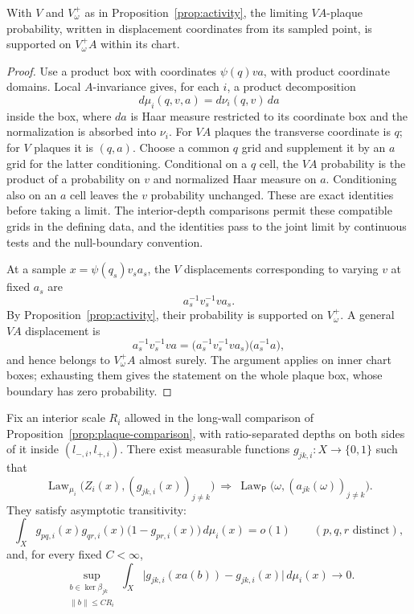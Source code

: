 \begin{lemma}\label{lem:va-support}
With $V$ and $V_\omega^+$ as in Proposition~\ref{prop:activity}, the
limiting $VA$-plaque probability, written in displacement coordinates
from its sampled point, is supported on $V_\omega^+A$ within its chart.
\end{lemma}

\begin{proof}
Use a product box with coordinates $\psi(q)va$, with product coordinate
domains.  Local $A$-invariance gives, for each $i$, a product
decomposition
\[
                d\mu_i(q,v,a)=d\nu_i(q,v)\,da
\]
inside the box, where $da$ is Haar measure restricted to its coordinate
box and the normalization is absorbed into $\nu_i$.  For $VA$ plaques
the transverse coordinate is $q$; for $V$ plaques it is $(q,a)$.
Choose a common $q$ grid and supplement it by an $a$ grid for the latter
conditioning.  Conditional on a $q$ cell, the $VA$ probability is the
product of a probability on $v$ and normalized Haar measure on $a$.
Conditioning also on an $a$ cell leaves the $v$ probability unchanged.
These are exact identities before taking a limit.  The interior-depth
comparisons permit these compatible grids in the defining data, and
the identities pass to the joint limit by continuous tests and the
null-boundary convention.

At a sample $x=\psi(q_s)v_sa_s$, the $V$ displacements corresponding to
varying $v$ at fixed $a_s$ are
\[
                         a_s^{-1}v_s^{-1}va_s.
\]
By Proposition~\ref{prop:activity}, their probability is supported on
$V_\omega^+$.  A general $VA$ displacement is
\[
 a_s^{-1}v_s^{-1}va
   =\bigl(a_s^{-1}v_s^{-1}va_s\bigr)\bigl(a_s^{-1}a\bigr),
\]
and hence belongs to $V_\omega^+A$ almost surely.  The argument applies
on inner chart boxes; exhausting them gives the statement on the whole
plaque box, whose boundary has zero probability.
\end{proof}

\begin{lemma}\label{lem:activity-indicators}
Fix an interior scale $R_i$ allowed in the long-wall comparison of
Proposition~\ref{prop:plaque-comparison}, with ratio-separated depths on
both sides of it inside $(l_{-,i},l_{+,i})$.  There exist measurable
functions $g_{jk,i}:X\to\{0,1\}$ such that
\[
 \operatorname{Law}_{\mu_i}\bigl(Z_i(x),(g_{jk,i}(x))_{j\ne k}\bigr)
 \ \Longrightarrow\
 \operatorname{Law}_{\mathsf P}
       \bigl(\omega,(a_{jk}(\omega))_{j\ne k}\bigr).
\]
They satisfy asymptotic transitivity:
\[
 \int_X g_{pq,i}(x)g_{qr,i}(x)
                  \bigl(1-g_{pr,i}(x)\bigr)\,d\mu_i(x)=o(1)
       \qquad(p,q,r\text{ distinct}),
\]
and, for every fixed $C<\infty$,
\begin{equation}\label{eq:wall-invariance}
 \sup_{\substack{b\in\ker\beta_{jk}\\ \|b\|\le CR_i}}
 \int_X\bigl|g_{jk,i}(xa(b))-g_{jk,i}(x)\bigr|\,d\mu_i(x)
                         \longrightarrow0.
\end{equation}
\end{lemma}

